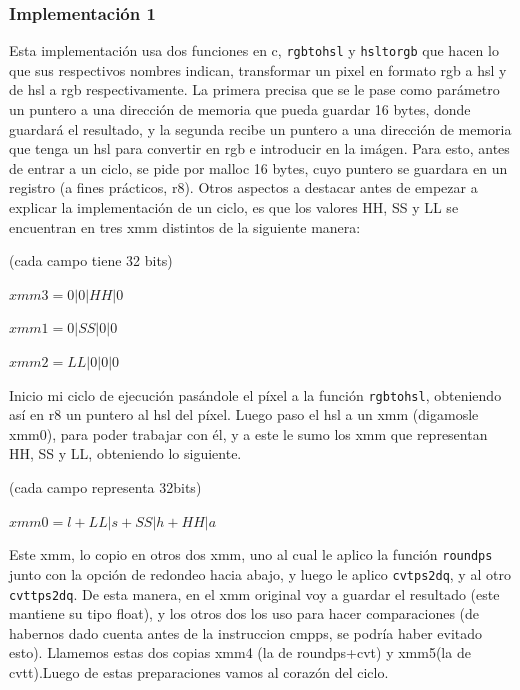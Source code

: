 \documentclass[a4paper]{article}
\begin{document}
\subsubsection{Implementación 1}

Esta implementación usa dos funciones en c, {\tt rgbtohsl} y {\tt hsltorgb} que hacen lo que sus respectivos nombres indican, transformar un pixel en formato rgb a hsl y de hsl a rgb respectivamente. La primera precisa que se le pase como parámetro un puntero a una dirección de memoria que pueda guardar 16 bytes, donde guardará el resultado, y la segunda recibe un puntero a una dirección de memoria que tenga un hsl para convertir en rgb e introducir en la imágen. Para esto, antes de entrar a un ciclo, se pide por malloc 16 bytes, cuyo puntero se guardara en un registro (a fines prácticos, r8).
Otros aspectos a destacar antes de empezar a explicar la implementación de un ciclo, es que los valores HH, SS y LL se encuentran en tres xmm distintos de la siguiente manera:

\vspace*{0.3cm}

(cada campo tiene 32 bits)

\vspace*{0.3cm}

$xmm3=0|0|HH|0$

\vspace*{0.3cm} 

$xmm1=0|SS|0|0$

\vspace*{0.3cm}

$xmm2=LL|0|0|0$

\vspace*{0.3cm}

Inicio mi ciclo de ejecución pasándole el píxel a la función {\tt rgbtohsl}, obteniendo así en r8 un puntero al hsl del píxel. Luego paso el hsl a un xmm (digamosle xmm0), para poder trabajar con él, y a este le sumo los xmm que representan HH, SS y LL, obteniendo lo siguiente.

(cada campo representa 32bits)

\vspace*{0.3cm}

$xmm0=l+LL|s+SS|h+HH|a$

\vspace*{0.3cm}

Este xmm, lo copio en otros dos xmm, uno al cual le aplico la función {\tt roundps} junto con la opción de redondeo hacia abajo, y luego le aplico {\tt cvtps2dq}, y al otro {\tt cvttps2dq}. De esta manera, en el xmm original voy a guardar el resultado (este mantiene su tipo float), y los otros dos los uso para hacer comparaciones (de habernos dado cuenta antes de la instruccion cmpps, se podría haber evitado esto). Llamemos estas dos copias xmm4 (la de roundps+cvt) y xmm5(la de cvtt).Luego de estas preparaciones vamos al corazón del ciclo.
\end{document}
